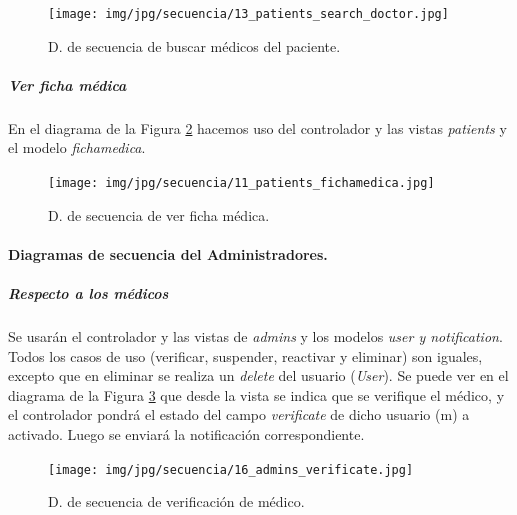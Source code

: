 \documentclass[a4paper,oneside,11pt]{book}
\begin{document}
					\begin{figure}[H]
					  \centering
					    \texttt{[image: img/jpg/secuencia/13\_patients\_search\_doctor.jpg]}
					  \caption{D. de secuencia de buscar médicos del paciente.}
					  \label{fig:cont_patient_doc_search}
					\end{figure}
				
				
				\bigskip
				\bigskip		
				\subparagraph{Ver ficha médica} %
				\label{subp:cont_ver_ficha_medica2}
					
					En el diagrama de la Figura \ref{fig:cont_patient_ficha} hacemos uso del controlador y las vistas \textit{patients} y el modelo \textit{fichamedica}.
						
						\begin{figure}[H]
						  \centering
						    \texttt{[image: img/jpg/secuencia/11\_patients\_fichamedica.jpg]}
						  \caption{D. de secuencia de ver ficha médica.}
						  \label{fig:cont_patient_ficha}
						\end{figure}
				
						


			\paragraph{Diagramas de secuencia del Administradores.} %
			\label{par:diagramas_de_secuencia_del_administradores_}
			
			
				\subparagraph{Respecto a los médicos} %
				\label{subp:cont_respecto_a_los_medicos}
				
					Se usarán el controlador y las vistas de \textit{admins} y los modelos \textit{user y notification}. Todos los casos de uso (verificar, suspender, reactivar y eliminar) son iguales, excepto que en eliminar se realiza un \textit{delete} del usuario (\textit{User}). Se puede ver en el diagrama de la Figura \ref{fig:cont_admin_verificate} que desde la vista se indica que se verifique el médico, y el controlador pondrá el estado del campo \textit{verificate} de dicho usuario (m) a activado. Luego se enviará la notificación correspondiente.
					
					\begin{figure}[H]
					  \centering
					    \texttt{[image: img/jpg/secuencia/16\_admins\_verificate.jpg]}
					  \caption{D. de secuencia de verificación de médico.}
					  \label{fig:cont_admin_verificate}
					\end{figure}	
				
\end{document}
